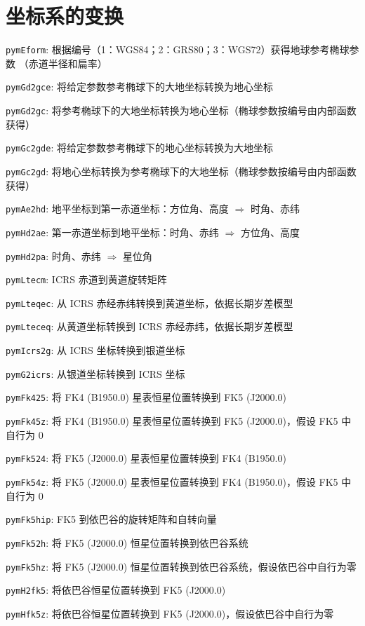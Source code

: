 \documentclass[11pt]{article}
\begin{document}
\newpage
\section{坐标系的变换}

\texttt{pymEform}: 根据编号（1：WGS84；2：GRS80；3：WGS72）获得地球参考椭球参数
（赤道半径和扁率）

\texttt{pymGd2gce}: 将给定参数参考椭球下的大地坐标转换为地心坐标

\texttt{pymGd2gc}: 将参考椭球下的大地坐标转换为地心坐标（椭球参数按编号由内部函数获得）

\texttt{pymGc2gde}: 将给定参数参考椭球下的地心坐标转换为大地坐标

\texttt{pymGc2gd}: 将地心坐标转换为参考椭球下的大地坐标（椭球参数按编号由内部函数获得）

\texttt{pymAe2hd}: 地平坐标到第一赤道坐标：方位角、高度 $\Rightarrow$ 时角、赤纬

\texttt{pymHd2ae}: 第一赤道坐标到地平坐标：时角、赤纬 $\Rightarrow$ 方位角、高度

\texttt{pymHd2pa}: 时角、赤纬 $\Rightarrow$ 星位角

\texttt{pymLtecm}: ICRS 赤道到黄道旋转矩阵

\texttt{pymLteqec}: 从 ICRS 赤经赤纬转换到黄道坐标，依据长期岁差模型

\texttt{pymLteceq}: 从黄道坐标转换到 ICRS 赤经赤纬，依据长期岁差模型

\texttt{pymIcrs2g}: 从 ICRS 坐标转换到银道坐标

\texttt{pymG2icrs}: 从银道坐标转换到 ICRS 坐标

\texttt{pymFk425}: 将 FK4 (B1950.0) 星表恒星位置转换到 FK5 (J2000.0)

\texttt{pymFk45z}: 将 FK4 (B1950.0) 星表恒星位置转换到 FK5 (J2000.0)，假设 FK5 中自行为 0

\texttt{pymFk524}: 将 FK5 (J2000.0) 星表恒星位置转换到 FK4 (B1950.0)

\texttt{pymFk54z}: 将 FK5 (J2000.0) 星表恒星位置转换到 FK4 (B1950.0)，假设 FK5 中自行为 0

\texttt{pymFk5hip}: FK5 到依巴谷的旋转矩阵和自转向量

\texttt{pymFk52h}: 将 FK5 (J2000.0) 恒星位置转换到依巴谷系统

\texttt{pymFk5hz}: 将 FK5 (J2000.0) 恒星位置转换到依巴谷系统，假设依巴谷中自行为零

\texttt{pymH2fk5}: 将依巴谷恒星位置转换到 FK5 (J2000.0)

\texttt{pymHfk5z}: 将依巴谷恒星位置转换到 FK5 (J2000.0)，假设依巴谷中自行为零
\end{document}
